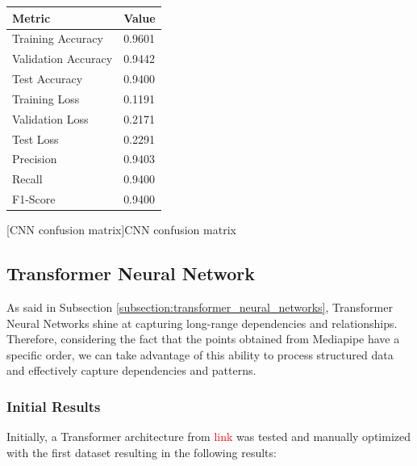 \begin{minipage}{0.35\textwidth}
    \label{table:cnn_dataset2_results}
    \centering
    \begin{tabular}{ |p{3.4cm}|p{1.1cm}| }
    \hline
    Metric & Value \\
    \hline
    Training Accuracy & 0.9601 \\
    \hline
    Validation Accuracy & 0.9442 \\
    \hline
    Test Accuracy & 0.9400 \\
    \hline
    Training Loss & 0.1191 \\
    \hline
    Validation Loss & 0.2171 \\
    \hline
    Test Loss & 0.2291 \\
    \hline
    Precision & 0.9403 \\
    \hline
    Recall & 0.9400 \\
    \hline
    F1-Score & 0.9400 \\
    \hline
    \end{tabular}
\end{minipage}%
\begin{minipage}{0.65\textwidth}
    \centering
    
    [CNN confusion matrix]{CNN confusion matrix}
    \label{fig:cnn_confusion_matrix}
\end{minipage}

\subsection{Transformer Neural Network}

As said in Subsection \ref{subsection:transformer_neural_networks}, Transformer Neural Networks shine at capturing long-range dependencies and relationships. Therefore, considering the fact that the points obtained from Mediapipe have a specific order, we can take advantage of this ability to process structured data and effectively capture dependencies and patterns.

\subsubsection{Initial Results}

Initially, a Transformer architecture from \textcolor{red}{link} was tested and manually optimized with the first dataset resulting in the following results:

